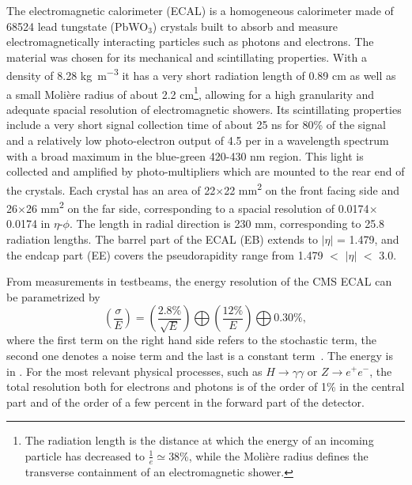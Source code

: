 The electromagnetic calorimeter (ECAL) is a homogeneous calorimeter made of \num{68524} lead tungstate (PbWO$_3$) crystals built to absorb and measure 
electromagnetically interacting particles such as photons and electrons. The material was chosen
for its mechanical and scintillating properties. With a density of 8.28 \si{\kilo\gram\per\cubic\meter} it has a very short radiation length of
0.89 \si{\centi\meter} as well as a small Moli\`{e}re radius of about 2.2 \si{\centi\meter}\footnote{The radiation length is the distance at which 
the energy of an incoming particle has decreased to $\frac{1}{e}\simeq$38\%, while the Moli\`{e}re radius defines the transverse containment of an 
electromagnetic shower.}, allowing for a high granularity and adequate spacial resolution of electromagnetic showers. Its scintillating properties
include a very short signal collection time of about 25 \si{\nano\second} for 80\% of the signal and a relatively low photo-electron output of
4.5 per \mev in a wavelength spectrum with a broad maximum in the blue-green 420-430 \si{\nano\meter} region. This light is collected
and amplified by photo-multipliers which are mounted to the rear end of the crystals.
Each crystal has an area of 22$\times$22 \si{\square\milli\meter} on the front facing side and 26$\times$26 
\si{\square\milli\meter} on the far side, corresponding to a spacial resolution of 0.0174$\times$0.0174 in  $\eta$-$\phi$. The length 
in radial direction is 230 \si{\milli\meter}, corresponding to \num{25.8} radiation lengths. The barrel part of the ECAL (EB) extends to 
$|\eta|$ = 1.479, and the endcap part (EE) covers the pseudorapidity range from 1.479 $<$ $|\eta|$ $<$ 3.0.

From measurements in testbeams, the energy resolution of the CMS ECAL can be parametrized by
\begin{equation}
    \left( \frac{\sigma}{E} \right) =   \left( \frac{\text{2.8\%}}{\sqrt{E}} \right)   \bigoplus  \left( \frac{\text{12\%}}{E} \right)  \bigoplus  \text{0.30\%} ,
\end{equation}
where the first term on the right hand side refers to the stochastic term, the second one denotes a noise term and the last is a constant term~\cite{ecalresolution}. The energy
is in \gev. For the most relevant physical processes, such as $H\rightarrow\gamma\gamma$ or $Z\rightarrow e^+e^-$, the total resolution
both for electrons and photons is of the order of 1\% in the central part and of the order of a few percent in the
forward part of the detector.

